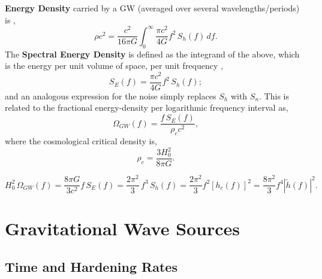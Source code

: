 \documentclass[10pt, oneside, onecolumn]{article}   	%
\begin{document}
            \textbf{Energy Density} carried by a GW (averaged over several wavelengths/periods) is \citep{moore2015},
            \begin{equation}
            \rho c^2 = \frac{c^2}{16\pi G} \int_0^\infty \frac{\pi c^2}{4G} f^2 \, S_h(f) \, df.
            \end{equation}
            The \textbf{Spectral Energy Density} is defined as the integrand of the above, which is the energy per unit volume of space, per unit frequency \citep{moore2015},
            \begin{equation}
            S_E(f) = \frac{\pi c^2}{4 G} f^2 \, S_h(f);
            \end{equation}
            and an analogous expression for the noise simply replaces $S_h$ with $S_n$.  This is related to the fractional energy-density per logarithmic frequency interval as,
            \begin{equation}
            \Omega_{GW}(f) = \frac{f \, S_E(f)}{\rho_c c^2},
            \end{equation}
            where the cosmological critical density is,
            \begin{equation}
            \rho_c = \frac{3 H_0^2}{8\pi G}.
            \end{equation}

            \begin{equation*}
            H_0^2 \, \Omega_{GW}(f) = \frac{8\pi G}{3 c^2} f \, S_E(f) = \frac{2 \pi^2}{3} \, f^3 \, S_h(f) = \frac{2\pi^2}{3} f^2 \left[h_c(f) \right]^2 = \frac{8\pi^2}{3} f^4 \left| \tilde{h}(f)\right|^2.
            \end{equation*}




    \section{Gravitational Wave Sources}

        \subsection{Time and Hardening Rates}
\end{document}
